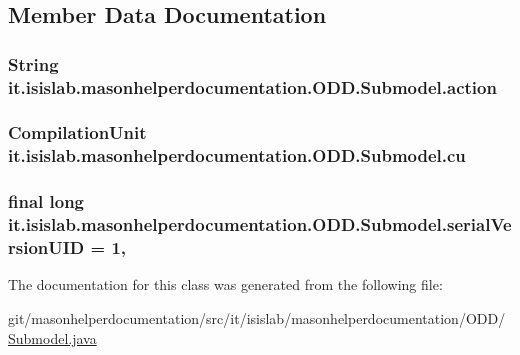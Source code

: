 \subsection{Member Data Documentation}
\hypertarget{classit_1_1isislab_1_1masonhelperdocumentation_1_1_o_d_d_1_1_submodel_a5f62abde24f5d75865b6e77cf1d15807}{
\subsubsection[{action}]{\setlength{\rightskip}{0pt plus 5cm}String it.\-isislab.\-masonhelperdocumentation.\-O\-D\-D.\-Submodel.\-action\hspace{0.3cm}{\ttfamily [private]}}}\label{classit_1_1isislab_1_1masonhelperdocumentation_1_1_o_d_d_1_1_submodel_a5f62abde24f5d75865b6e77cf1d15807}
\hypertarget{classit_1_1isislab_1_1masonhelperdocumentation_1_1_o_d_d_1_1_submodel_a39701b80035981f257dc7e09a81e3115}{
\subsubsection[{cu}]{\setlength{\rightskip}{0pt plus 5cm}Compilation\-Unit it.\-isislab.\-masonhelperdocumentation.\-O\-D\-D.\-Submodel.\-cu\hspace{0.3cm}{\ttfamily [private]}}}\label{classit_1_1isislab_1_1masonhelperdocumentation_1_1_o_d_d_1_1_submodel_a39701b80035981f257dc7e09a81e3115}
\hypertarget{classit_1_1isislab_1_1masonhelperdocumentation_1_1_o_d_d_1_1_submodel_aff94e093c834ac7fb7cc6bde2d1f2325}{
\subsubsection[{serial\-Version\-U\-I\-D}]{\setlength{\rightskip}{0pt plus 5cm}final long it.\-isislab.\-masonhelperdocumentation.\-O\-D\-D.\-Submodel.\-serial\-Version\-U\-I\-D = 1\hspace{0.3cm}{\ttfamily [static]}, {\ttfamily [private]}}}\label{classit_1_1isislab_1_1masonhelperdocumentation_1_1_o_d_d_1_1_submodel_aff94e093c834ac7fb7cc6bde2d1f2325}


The documentation for this class was generated from the following file\-:\begin{DoxyCompactItemize}
\item 
git/masonhelperdocumentation/src/it/isislab/masonhelperdocumentation/\-O\-D\-D/\hyperlink{_submodel_8java}{Submodel.\-java}\end{DoxyCompactItemize}

